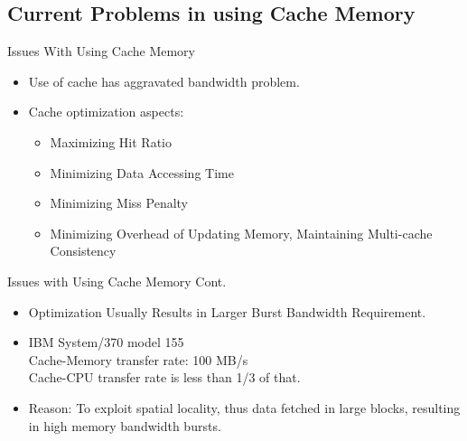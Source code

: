 \documentclass{beamer}
\begin{document}
\subsection{Current Problems in using Cache Memory}
\begin{frame}{Issues With Using Cache Memory}
	\begin{itemize}
		\item {
			Use of cache has aggravated bandwidth problem.
			\pause
		}
		\item{
			Cache optimization aspects:
			\begin{itemize}
				\item {
					Maximizing Hit Ratio
				}
				\item{
					Minimizing Data Accessing Time
				}
				\item{
					Minimizing Miss Penalty
				}
				\item{
					Minimizing Overhead of Updating Memory, Maintaining Multi-cache Consistency
				}
			\end{itemize}
		
		}
	\end{itemize}
	
\end{frame}

\begin{frame}{Issues with Using Cache Memory Cont.}
	\begin{itemize}
		\item {
			Optimization Usually Results in Larger Burst Bandwidth Requirement.
		}
		\item{
			\begin{Example}
			IBM System/370 model 155 \\ Cache-Memory transfer rate: 100 MB/s \\ Cache-CPU transfer rate is less than 1/3 of that.
			\pause
			\end{Example}
		}
		\item{
			Reason: To exploit spatial locality, thus data fetched in large blocks, resulting in high memory bandwidth bursts.
		}
	\end{itemize}

\end{frame}
\end{document}
